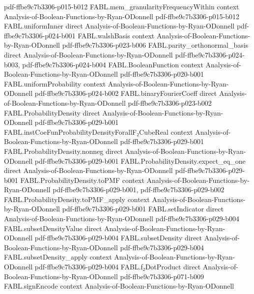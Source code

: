 \begin{theorem}
  {pdf-ffbe9c7b3306-p015-b012}
\proofstep
  {FABL.mem_granularityFrequencyWithin}
  {context}
  {Analysis-of-Boolean-Functions-by-Ryan-ODonnell}
  {pdf-ffbe9c7b3306-p015-b012}
\proofstep
  {FABL.uniformInner}
  {direct}
  {Analysis-of-Boolean-Functions-by-Ryan-ODonnell}
  {pdf-ffbe9c7b3306-p024-b001}
\proofstep
  {FABL.walshBasis}
  {context}
  {Analysis-of-Boolean-Functions-by-Ryan-ODonnell}
  {pdf-ffbe9c7b3306-p023-b006}
\proofstep
  {FABL.parity_orthonormal_basis}
  {direct}
  {Analysis-of-Boolean-Functions-by-Ryan-ODonnell}
  {pdf-ffbe9c7b3306-p024-b003,
    pdf-ffbe9c7b3306-p024-b004}
\proofstep
  {FABL.BooleanFunction}
  {context}
  {Analysis-of-Boolean-Functions-by-Ryan-ODonnell}
  {pdf-ffbe9c7b3306-p020-b001}
\proofstep
  {FABL.uniformProbability}
  {context}
  {Analysis-of-Boolean-Functions-by-Ryan-ODonnell}
  {pdf-ffbe9c7b3306-p024-b002}
\proofstep
  {FABL.binaryFourierCoeff}
  {direct}
  {Analysis-of-Boolean-Functions-by-Ryan-ODonnell}
  {pdf-ffbe9c7b3306-p023-b002}
\proofstep
  {FABL.ProbabilityDensity}
  {direct}
  {Analysis-of-Boolean-Functions-by-Ryan-ODonnell}
  {pdf-ffbe9c7b3306-p029-b001}
\proofstep
  {FABL.instCoeFunProbabilityDensityForallF₂CubeReal}
  {context}
  {Analysis-of-Boolean-Functions-by-Ryan-ODonnell}
  {pdf-ffbe9c7b3306-p029-b001}
\proofstep
  {FABL.ProbabilityDensity.nonneg}
  {direct}
  {Analysis-of-Boolean-Functions-by-Ryan-ODonnell}
  {pdf-ffbe9c7b3306-p029-b001}
\proofstep
  {FABL.ProbabilityDensity.expect_eq_one}
  {direct}
  {Analysis-of-Boolean-Functions-by-Ryan-ODonnell}
  {pdf-ffbe9c7b3306-p029-b001}
\proofstep
  {FABL.ProbabilityDensity.toPMF}
  {context}
  {Analysis-of-Boolean-Functions-by-Ryan-ODonnell}
  {pdf-ffbe9c7b3306-p029-b001,
    pdf-ffbe9c7b3306-p029-b002}
\proofstep
  {FABL.ProbabilityDensity.toPMF_apply}
  {context}
  {Analysis-of-Boolean-Functions-by-Ryan-ODonnell}
  {pdf-ffbe9c7b3306-p029-b001}
\proofstep
  {FABL.setIndicator}
  {direct}
  {Analysis-of-Boolean-Functions-by-Ryan-ODonnell}
  {pdf-ffbe9c7b3306-p029-b004}
\proofstep
  {FABL.subsetDensityValue}
  {direct}
  {Analysis-of-Boolean-Functions-by-Ryan-ODonnell}
  {pdf-ffbe9c7b3306-p029-b004}
\proofstep
  {FABL.subsetDensity}
  {direct}
  {Analysis-of-Boolean-Functions-by-Ryan-ODonnell}
  {pdf-ffbe9c7b3306-p029-b004}
\proofstep
  {FABL.subsetDensity_apply}
  {context}
  {Analysis-of-Boolean-Functions-by-Ryan-ODonnell}
  {pdf-ffbe9c7b3306-p029-b004}
\proofstep
  {FABL.f₂DotProduct}
  {direct}
  {Analysis-of-Boolean-Functions-by-Ryan-ODonnell}
  {pdf-ffbe9c7b3306-p071-b009}
\proofstep
  {FABL.signEncode}
  {context}
  {Analysis-of-Boolean-Functions-by-Ryan-ODonnell}

\end{theorem}

